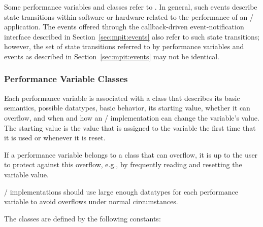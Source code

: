 Some performance variables and classes refer to .
%
%
In general,
such events describe state transitions within software or hardware related
to the performance of an \MPI/ application. The events offered through the
callback-driven event-notification interface described in
Section~\ref{sec:mpit:events} also refer to such state transitions;
however, the set of state transitions referred to by performance variables and
events as described in Section~\ref{sec:mpit:events} may not be identical.

\subsubsection{Performance Variable Classes}
\label{sec:tools:mpit:classes}

Each performance variable is associated with a class that describes its
basic semantics, possible datatypes, basic behavior, its starting value,
whether it can overflow, and when and how an \MPI/ implementation can
change the variable's value.  The starting value is the value that is
assigned to the variable the first time that it is used or whenever it is
reset.

\begin{users}
If a performance variable belongs to a class that can overflow, it is up to
the user to protect against this overflow, e.g., by frequently reading and
resetting the variable value.
\end{users}

\begin{implementors}
\MPI/ implementations should use large enough datatypes for each
performance variable to avoid overflows under normal circumstances.
\end{implementors}

The classes are defined by the following constants:

